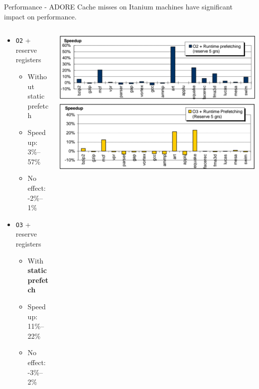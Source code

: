 \documentclass[aspectratio=169,xcolor=x11names]{beamer}
\begin{document}
	\begin{frame}{Performance - ADORE}
		Cache misses on Itanium machines have significant impact on performance.
		
		\begin{columns}
			\begin{column}{0.4\linewidth}
				\begin{itemize}
					\item \texttt{O2} + reserve registers
					\begin{itemize}
						\item Without static prefetch
						\item Speedup: 3\%--57\%
						\item No effect: -2\%--1\%
					\end{itemize}
					\item \texttt{O3} + reserve registers
					\begin{itemize}
						\item With \textbf{static prefetch}
						\item Speedup: 11\%--22\%
						\item No effect: -3\%--2\%
					\end{itemize}
				\end{itemize}
			\end{column}
			\begin{column}{0.6\linewidth}
				\includegraphics[width=\textwidth]{ADORE-speedup1}\\
				\includegraphics[width=\textwidth]{ADORE-speedup2}
			\end{column}
		\end{columns}
	\end{frame}
\end{document}
